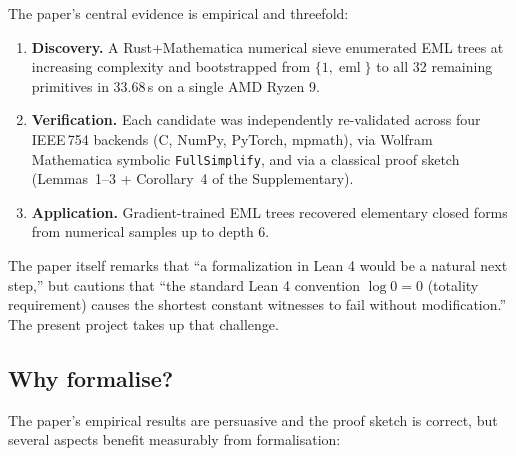\documentclass[11pt,a4paper]{article}
\theoremstyle{plain}
\theoremstyle{definition}
\newcommand{\eml}{\operatorname{eml}}
\begin{document}
The paper's central evidence is empirical and threefold:
\begin{enumerate}
    \item \textbf{Discovery.} A Rust+Mathematica numerical sieve
        enumerated EML trees at increasing complexity and bootstrapped from
        $\{1,\eml\}$ to all 32 remaining primitives in 33.68\,s on a single
        AMD Ryzen 9.
    \item \textbf{Verification.} Each candidate was independently
        re-validated across four IEEE\,754 backends (C, NumPy, PyTorch,
        mpmath), via Wolfram Mathematica symbolic
        \texttt{FullSimplify}, and via a classical proof sketch
        (Lemmas~1--3 + Corollary~4 of the Supplementary).
    \item \textbf{Application.} Gradient-trained EML trees recovered
        elementary closed forms from numerical samples up to depth 6.
\end{enumerate}

The paper itself remarks that ``a formalization in Lean 4 would be a
natural next step,'' but cautions that ``the standard Lean 4 convention
$\log 0 = 0$ (totality requirement) causes the shortest constant witnesses
to fail without modification.''  The present project takes up that
challenge.

\subsection{Why formalise?}

The paper's empirical results are persuasive and the proof sketch is
correct, but several aspects benefit measurably from formalisation:
\end{document}
